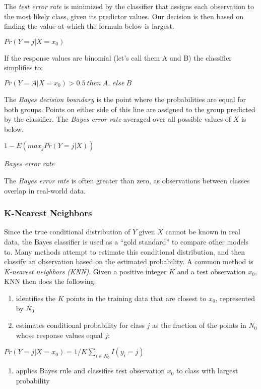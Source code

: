 \documentclass[]{book}
\providecommand{\tightlist}{%
  \setlength{\itemsep}{0pt}\setlength{\parskip}{0pt}}
\begin{document}
The \emph{test error rate} is minimized by the classifier that assigns each observation to the most likely class, given its predictor values. Our decision is then based on finding the value at which the formula below is largest.

\(Pr(Y = j|X = x_0)\)

If the response values are binomial (let's call them A and B) the classifier simplifies to:

\(Pr(Y = A|X = x_0) > 0.5\:then\:A,\:else\:B\)

The \emph{Bayes decision boundary} is the point where the probabilities are equal for both groups. Points on either side of this line are assigned to the group predicted by the classifier. The \emph{Bayes error rate} averaged over all possible values of \(X\) is below.

\(1-E(max_jPr(Y = j|X))\)

\emph{Bayes error rate}

The \emph{Bayes error rate} is often greater than zero, as observations between classes overlap in real-world data.

\hypertarget{k-nearest-neighbors}{%
\subsubsection{K-Nearest Neighbors}\label{k-nearest-neighbors}}

Since the true conditional distribution of \(Y\) given \(X\) cannot be known in real data, the Bayes classifier is used as a ``gold standard'' to compare other models to. Many methods attempt to estimate this conditional distribution, and then classify an observation based on the estimated probability. A common method is \emph{K-nearest neighbors (KNN)}. Given a positive integer \(K\) and a test observation \(x_0\), KNN then does the following:

\begin{enumerate}
\def\labelenumi{\arabic{enumi}.}
\tightlist
\item
  identifies the \(K\) points in the training data that are closest to \(x_0\), represented by \(N_0\)
\item
  estimates conditional probability for class \(j\) as the fraction of the points in \(N_0\) whose response values equal \(j\):
\end{enumerate}

\(Pr(Y = j| X = x_0) = 1/K\sum_{i\in N_0}I(y_i = j)\)

\begin{enumerate}
\def\labelenumi{\arabic{enumi}.}
\setcounter{enumi}{2}
\tightlist
\item
  applies Bayes rule and classifies test observation \(x_0\) to class with largest probability
\end{enumerate}
\end{document}
